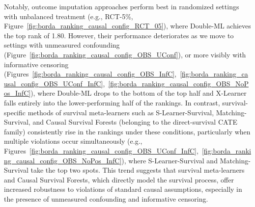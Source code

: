 \documentclass{article} %
\begin{document}
Notably, outcome imputation approaches perform best in randomized settings with unbalanced treatment (e.g., RCT-5\%, Figure~\ref{fig:borda_ranking_causal_config_RCT_05}), where Double-ML achieves the top rank of 1.80. However, their performance deteriorates as we move to settings with unmeasured confounding (Figure~\ref{fig:borda_ranking_causal_config_OBS_UConf}), or more visibly with informative censoring (Figures~\ref{fig:borda_ranking_causal_config_OBS_InfC},~\ref{fig:borda_ranking_causal_config_OBS_UConf_InfC},~\ref{fig:borda_ranking_causal_config_OBS_NoPos_InfC}), where Double-ML drops to the bottom of the top half and X-Learner falls entirely into the lower-performing half of the rankings. In contrast, survival-specific methods of survival meta-learners such as S-Learner-Survival, Matching-Survival, and Causal Survival Forests (belonging to the direct-survival CATE family) consistently rise in the rankings under these conditions, particularly when multiple violations occur simultaneously (e.g., Figures~\ref{fig:borda_ranking_causal_config_OBS_UConf_InfC},~\ref{fig:borda_ranking_causal_config_OBS_NoPos_InfC}), where S-Learner-Survival and Matching-Survival take the top two spots. This trend suggests that survival meta-learners and Causal Survival Forests, which directly model the survival process, offer increased robustness to violations of standard causal assumptions, especially in the presence of unmeasured confounding and informative censoring.
\end{document}
